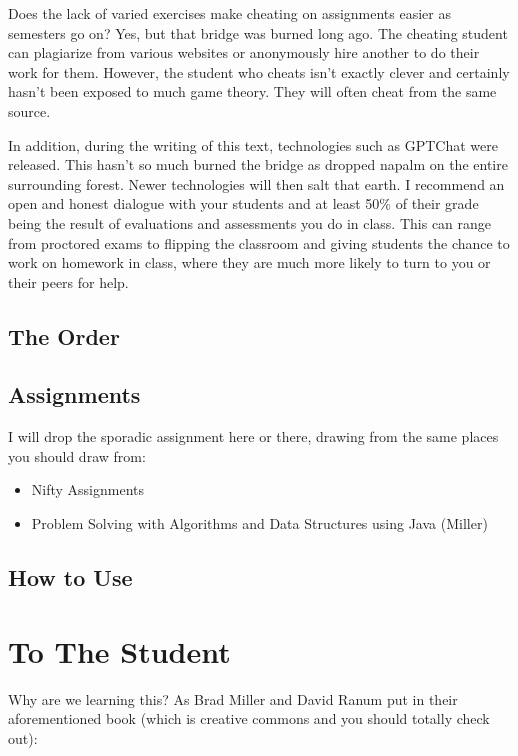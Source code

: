 Does the lack of varied exercises make cheating on assignments easier as semesters go on?  Yes, but that bridge was burned long ago.  
The cheating student can plagiarize from various websites or anonymously hire another to do their work for them.
However, the student who cheats isn't exactly clever and certainly hasn't been exposed to much game theory.  
They will often cheat from the same source.  

In addition, during the writing of this text, technologies such as GPTChat were released.  This hasn't so much burned the bridge as dropped napalm on the entire surrounding forest.  Newer technologies will then salt that earth. I recommend an open and honest dialogue with your students and at least 50\% of their grade being the result of evaluations and assessments you do in class.  This can range from proctored exams to flipping the classroom and giving students the chance to work  on homework in class, where they are much more likely to turn to you or their peers for help.


\subsection{The Order}


\subsection{Assignments}
I will drop the sporadic assignment here or there, drawing from the same places you should draw from:
\begin{itemize}
	\item Nifty Assignments
	\item  Problem Solving with Algorithms and Data Structures using Java (Miller)
\end{itemize}

\subsection{How to Use}

\section{To The Student}



Why are we learning this?  As Brad Miller and David Ranum put in their aforementioned book (which is creative commons and you should totally check out):

